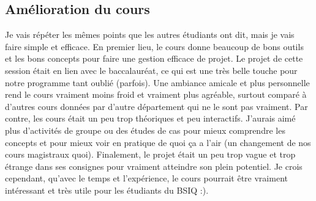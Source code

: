 \documentclass[11pt]{article}
\begin{document}
\subsection{Amélioration du cours}
Je vais répéter les mêmes points que les autres étudiants ont dit, mais je vais faire simple et efficace. En premier lieu, le cours donne beaucoup de bons outils et les bons concepts pour faire une gestion efficace de projet. Le projet de cette session était en lien avec le baccalauréat, ce qui est une très belle touche pour notre programme tant oublié (parfois). Une ambiance amicale et plus personnelle rend le cours vraiment moins froid et vraiment plus agréable, surtout comparé à d'autres cours données par d'autre département qui ne le sont pas vraiment. Par contre, les cours était un peu trop théoriques et peu interactifs. J'aurais aimé plus d'activités de groupe ou des études de cas pour mieux comprendre les concepts et pour mieux voir en pratique de quoi ça a l'air (un changement de nos cours magistraux quoi). Finalement, le projet était un peu trop vague et trop étrange dans ses consignes pour vraiment atteindre son plein potentiel. Je crois cependant, qu'avec le temps et l'expérience, le cours pourrait être vraiment intéressant et très utile pour les étudiants du BSIQ :).
\end{document}
